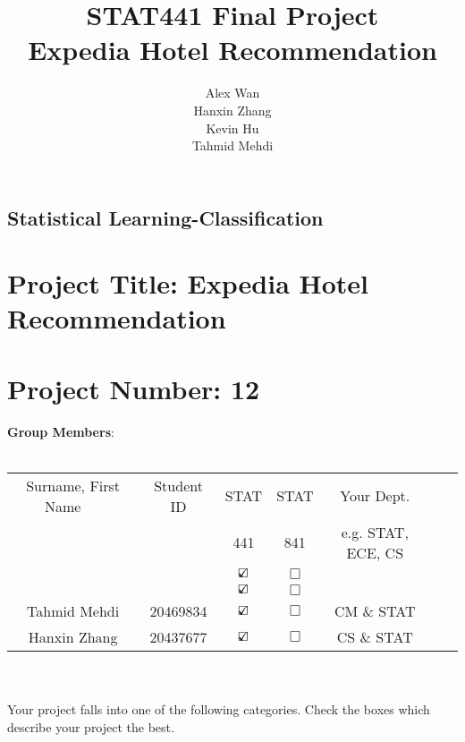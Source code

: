 \documentclass[12pt]{report}
\title{STAT441 Final Project \\ \large Expedia Hotel Recommendation}
\author{Alex Wan \\ Hanxin Zhang \\ Kevin Hu \\ Tahmid Mehdi}
\begin{document}
\thispagestyle{empty}

\begin{center}
\section*{Statistical Learning-Classification}
\end{center}




\section*{Project Title: Expedia Hotel Recommendation}
\section*{Project Number: 12}

{\large \textbf{Group Members}:}\\\\
\begin{tabular}{|c|c||c| c| c| c|c|}
  \hline
Surname, First Name $~~~~~$& Student ID   & STAT    & STAT &  Your Dept. \\
 $~~~~~$& & 441  & 841 &  e.g. STAT, ECE, CS\\
  \hline \hline
   &  & $\text{\rlap{$\checkmark$}}\square$     &   $\Box$& \\\hline
   &  & $\text{\rlap{$\checkmark$}}\square$       &  $\Box$& \\\hline
Tahmid Mehdi & 20469834 & $\text{\rlap{$\checkmark$}}\square$     &  $\Box$& CM \& STAT\\ \hline
Hanxin Zhang   & 20437677  & $\text{\rlap{$\checkmark$}}\square$     &  $\Box$& CS \& STAT\\
     \hline
\end{tabular}\\\\

  
Your project falls into one of the following categories. Check the
boxes which describe your project the best.
\end{document}
